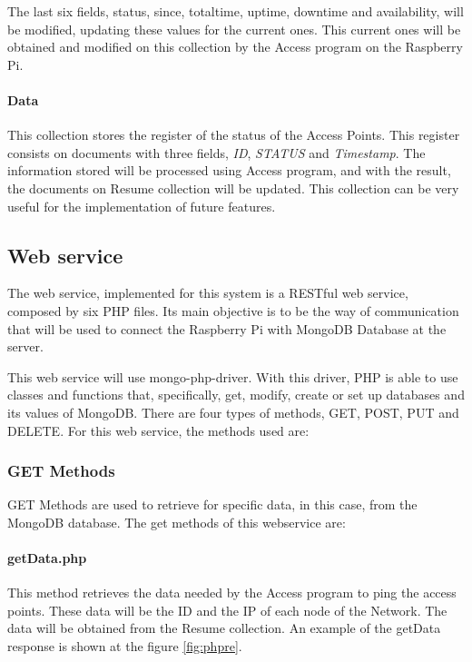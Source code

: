 \documentclass[12pt, a4paper,twoside]{tesi_upf}
\begin{document}
            The last six fields, status, since, totaltime, uptime, downtime and availability, will be modified, updating these values for the current ones. This current ones will be obtained and modified on this collection by the Access program on the Raspberry Pi.
            
            \paragraph{Data}
            
            This collection stores the register of the status of the Access Points. This register consists on documents with three fields, \textit{ID}, \textit{STATUS} and \textit{Timestamp}. 
            The information stored will be processed using Access program, and with the result, the documents on Resume collection will be updated.
            This collection can be very useful for the implementation of future features.
        
        \subsection{Web service}
        \label{web service}
        The web service, implemented for this system is a RESTful web service, composed by six PHP files. Its main objective is to be the way of communication that will be used to connect the Raspberry Pi with MongoDB Database at the server. 
        
        This web service will use mongo-php-driver. With this driver, PHP is able to use classes and functions that, specifically, get, modify, create or set up databases and its values of MongoDB. There are four types of methods, GET, POST, PUT and DELETE. For this web service, the methods used are:
            \subsubsection{GET Methods}
            GET Methods are used to retrieve for specific data, in this case, from the MongoDB database. The get methods of this webservice are:
                \paragraph{getData.php}
                This method retrieves the data needed by the Access program to ping the access points. These data will be the ID and the IP of each node of the Network. The data will be obtained from the Resume collection. An example of the getData response is shown at the figure \ref{fig:phpre}.
                
\end{document}
